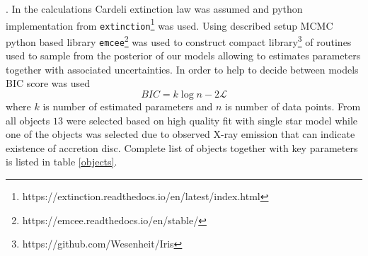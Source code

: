 \documentclass{pracalicmgr}
\begin{document}
\citep{drimmel_three-dimensional_2003}. In the calculations Cardeli extinction law was assumed \citep{cardelli_relationship_1989}
and python implementation from \texttt{extinction}\footnote{https://extinction.readthedocs.io/en/latest/index.html} was used.
Using described setup MCMC python based library \texttt{emcee}\footnote{https://emcee.readthedocs.io/en/stable/} \citep{foreman-mackey_emcee_2013}
was used to construct compact library\footnote{https://github.com/Wesenheit/Iris} of routines used to sample from the posterior of our models allowing to estimates parameters together
with associated uncertainties. In order to help to decide between models 
BIC score was used 
\begin{equation}
    BIC=k\log{n}-2\mathcal{L}
\end{equation} where $k$ is number of estimated parameters and $n$ is  number of data points. From all objects $13$  were selected based on high quality fit with single star model while one of the objects was selected due to observed X-ray emission 
that can indicate existence of accretion disc. Complete list of objects together with key parameters is listed in table \ref{objects}.
\end{document}
